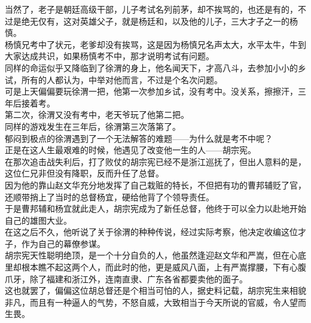 \begin{multicols}{\theparacolNo}
当然了，老子是朝廷高级干部，儿子考试名列前茅，却不挨骂的，也还是有的，不过是绝无仅有，这对英雄父子，就是杨廷和，以及他的儿子，三大才子之一的杨慎。\\

杨慎兄考中了状元，老爹却没有挨骂，这是因为杨慎兄名声太大，水平太牛，牛到大家达成共识，如果杨慎考不中，那才说明考试有问题。\\

同样的命运似乎又降临到了徐渭的身上，他名闻天下，才高八斗，去参加小小的乡试，所有的人都认为，中举对他而言，不过是个名次问题。\\

可是上天偏偏要玩徐渭一把，他第一次参加乡试，没有考中。没关系，擦擦汗，三年后接着考。\\

第二次，徐渭又没有考中，老天爷玩了他第二把。\\

同样的游戏发生在三年后，徐渭第三次落第了。\\

郁闷到极点的徐渭遇到了一个无法解答的难题——为什么就是考不中呢？\\

正是在这人生最艰难的时候，他遇见了改变他一生的人——胡宗宪。\\

在那次追击战失利后，打了败仗的胡宗宪已经不是浙江巡抚了，但出人意料的是，这位仁兄非但没有降职，反而升任了总督。\\

因为他的靠山赵文华充分地发挥了自己栽赃的特长，不但把有功的曹邦辅贬了官，还顺带捎上了当时的总督杨宜，硬给他背了个领导责任。\\

于是曹邦辅和杨宜就此走人，胡宗宪成为了新任总督，他终于可以全力以赴地开始自己的雄图大业。\\

在这之后不久，他听说了关于徐渭的种种传说，经过实际考察，他决定收编这位才子，作为自己的幕僚参谋。\\

胡宗宪天性聪明绝顶，是一个十分自负的人，他虽然逢迎赵文华和严嵩，但在心底里却根本瞧不起这两个人，而此时的他，更是威风八面，上有严嵩撑腰，下有心腹爪牙，除了福建和浙江外，连南直隶、广东各省都要卖他的面子。\\

这也就罢了，偏偏这位胡总督还是个相当可怕的人，据史料记载，胡宗宪生来相貌非凡，而且有一种逼人的气势，不怒自威，大致相当于今天所说的官威，令人望而生畏。\\


\end{multicols}
